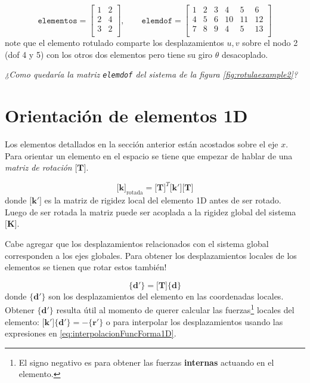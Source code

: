 \documentclass[11pt, a4paper,titlepage]{article}
\newcommand{\Mme}[1]{\boldsymbol{[}\mathbf{#1} \boldsymbol{]}}
\newcommand{\Cme}[1]{\boldsymbol{\{ }\mathbf{#1} \boldsymbol{\}} }
\newcommand{\MK}{\Mme{K}}
\newcommand{\Mk}{\Mme{k}}
\begin{document}
\begin{equation*} \label{eq:elemdofParaRotulaEjemplo}
\texttt{elementos} = \begin{bmatrix}
1 & 2  \\
2 & 4 \\
3 & 2\\
\end{bmatrix},
\qquad
\texttt{elemdof} = \begin{bmatrix}
1 & 2 & 3 & 4 & 5 & 6 \\
4 & 5 & 6 & 10 & 11 & 12  \\
7 & 8 & 9 & 4 & 5 & 13 \\
\end{bmatrix}
\end{equation*}
note que el elemento rotulado comparte los desplazamientos $u,v$ sobre el nodo 2 (dof 4 y 5) con los otros dos elementos pero tiene su giro $\theta$ desacoplado.

\textit{¿Como quedaría la matriz \texttt{elemdof} del sistema de la figura \ref{fig:rotulaexample2}?}


\section{Orientación de elementos 1D} \label{sec:OrientacionElementos}
Los elementos detallados en la sección anterior están acostados sobre el eje $x$. Para orientar un elemento en el espacio se tiene que empezar de hablar de una \textit{matriz de rotación} $\Mme{T}$.

\begin{equation} \label{eq:rotacionElemento}
	\Mk_{\mathrm{rotada}}= \Mme{T}^T \Mme{k'} \Mme{T}
\end{equation}
donde $\Mme{k'} $ es la matriz de rigidez local del elemento 1D antes de ser rotado. Luego de ser rotada la matriz puede ser acoplada a la rigidez global del sistema $\MK$.

Cabe agregar que los desplazamientos relacionados con el sistema global corresponden a los ejes globales. Para obtener los desplazamientos locales de los elementos se tienen que rotar estos también!

\begin{equation} \label{eq:rotacionDesplazamientos}
\Cme{d'}= \Mme{T} \Cme{d}  
\end{equation}
donde $\Cme{d'}$ son los desplazamientos del elemento en las coordenadas locales. Obtener $\Cme{d'}$ resulta útil al momento de querer calcular las fuerzas\footnote{El signo negativo es para obtener las fuerzas \textbf{internas} actuando en el elemento.} locales del elemento: \( \Mme{k'}\Cme{d'}= - \Cme{r'} \) o para interpolar los desplazamientos usando las expresiones en \eqref{eq:interpolacionFuncForma1D}.
\end{document}
